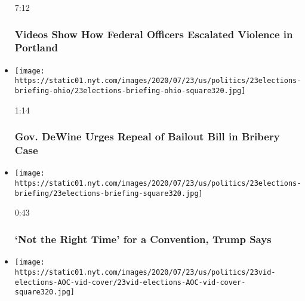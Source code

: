 \begin{itemize}
  7:12

  \hypertarget{videos-show-how-federal-officers-escalated-violence-in-portland}{%
  \subsubsection{Videos Show How Federal Officers Escalated Violence in
  Portland}\label{videos-show-how-federal-officers-escalated-violence-in-portland}}
\item
  \href{https://www.nytimes.com/video/us/100000007253892/mike-dewine-repeal-law-bribery-case.html?action=click\&module=video-series-bar\&region=header\&pgtype=Article\&playlistId=video/us-politics}{}

  \texttt{[image: https://static01.nyt.com/images/2020/07/23/us/politics/23elections-briefing-ohio/23elections-briefing-ohio-square320.jpg]}

  1:14

  \hypertarget{gov-dewine-urges-repeal-of-bailout-bill-in-bribery-case}{%
  \subsubsection{Gov. DeWine Urges Repeal of Bailout Bill in Bribery
  Case}\label{gov-dewine-urges-repeal-of-bailout-bill-in-bribery-case}}
\item
  \href{https://www.nytimes.com/video/us/100000007253968/trump-cancels-gop-convention.html?action=click\&module=video-series-bar\&region=header\&pgtype=Article\&playlistId=video/us-politics}{}

  \texttt{[image: https://static01.nyt.com/images/2020/07/23/us/politics/23elections-briefing/23elections-briefing-square320.jpg]}

  0:43

  \hypertarget{not-the-right-time-for-a-convention-trump-says}{%
  \subsubsection{`Not the Right Time' for a Convention, Trump
  Says}\label{not-the-right-time-for-a-convention-trump-says}}
\item
  \href{https://www.nytimes.com/video/us/100000007253391/aoc-confronts-yoho.html?action=click\&module=video-series-bar\&region=header\&pgtype=Article\&playlistId=video/us-politics}{}

  \texttt{[image: https://static01.nyt.com/images/2020/07/23/us/politics/23vid-elections-AOC-vid-cover/23vid-elections-AOC-vid-cover-square320.jpg]}


\end{itemize}
